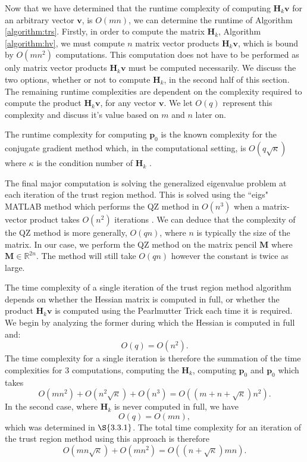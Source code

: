 \documentclass[letterpaper,12pt,titlepage,oneside,final]{book}
\begin{document}
	Now that we have determined that the runtime complexity of computing $\mathbf{H}_{k}\mathbf{v}$ for an arbitrary vector $\mathbf{v}$, is $O(mn)$, we can determine the runtime of Algorithm \ref{algorithm:trs}. Firstly, in order to compute the matrix $\mathbf{H}_{k}$, Algorithm \ref{algorithm:hv}, we must compute $n$ matrix vector products $\mathbf{H}_{k}\mathbf{v}$, which is bound by $O(mn^{2})$ computations. This computation does not have to be performed as only matrix vector products $\mathbf{H}_{k}\mathbf{v}$ must be computed necessarily. We discuss the two options, whether or not to compute $\mathbf{H}_{k}$, in the second half of this section. The remaining runtime complexities are dependent on the complexity required to compute the product $\mathbf{H}_{k}\mathbf{v}$, for any vector $\mathbf{v}$. We let $O(q)$ represent this complexity and discuss it's value based on $m$ and $n$ later on.
	
	The runtime complexity for computing $\mathbf{p}_{0}$ 
	is the known complexity for the conjugate gradient method which, in the computational setting, is $O(q\sqrt{\kappa})$ where $\kappa$ is the condition number of $\mathbf{H}_{k}$ \cite{shewchuk1994introduction}. 
	
	The final major computation is solving the generalized eigenvalue problem at each iteration of the trust region method. This is solved using the ``eigs" MATLAB method which performs the QZ method in $O(n^{3})$ when a matrix-vector product takes $O(n^2)$ iterations \cite{golub1989matrix}. We can deduce that the complexity of the QZ method is more generally, $O(qn)$, where $n$ is typically the size of the matrix. In our case, we perform the QZ method on the matrix pencil $\mathbf{M}$ where $\mathbf{M} \in \mathbb{R}^{2n}$. The method will still take $O(qn)$ however the constant is twice as large.
	
	The time complexity of a single iteration of the trust region method algorithm depends on whether the Hessian matrix is computed in full, or whether the product $\mathbf{H}_{k}\mathbf{v}$ is computed using the Pearlmutter Trick each time it is required. We begin by analyzing the former during which the Hessian is computed in full and:
	\begin{equation}
	O(q) = O(n^{2}).
	\end{equation}
	The time complexity for a single iteration is therefore the summation of the time complexities for 3 computations, computing the $\mathbf{H}_{k}$, computing $\mathbf{p}_{0}$ and $\mathbf{p}_{0}$ which takes 
	\begin{equation}
	O(mn^{2}) + O(n^{2}\sqrt{\kappa}) + O(n^{3}) = O((m+n+\sqrt{\kappa})n^{2}).
	\end{equation}
	In the second case, where $\mathbf{H}_{k}$ is never computed in full, we have 
	\begin{equation}
	O(q) = O(mn),
	\end{equation} 
	which was determined in $\S{3.3.1}$. The total time complexity for an iteration of the trust region method using this approach is therefore
	\begin{equation}
	O(mn\sqrt{\kappa}) + O(mn^{2}) = O((n+\sqrt{\kappa})mn).
	\end{equation}
	
\end{document}
